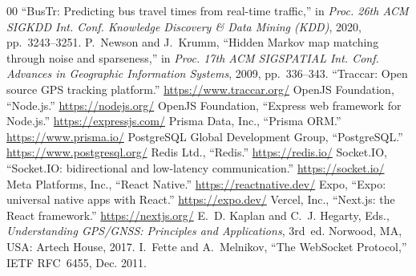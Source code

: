 \documentclass[conference]{IEEEtran}
\begin{document}
\begin{thebibliography}{00}
``BusTr: Predicting bus travel times from real-time traffic,'' in
\textit{Proc. 26th ACM SIGKDD Int. Conf. Knowledge Discovery \& Data Mining
(KDD)}, 2020, pp.~3243--3251.
P.~Newson and J.~Krumm, ``Hidden Markov map matching through noise and
sparseness,'' in \textit{Proc. 17th ACM SIGSPATIAL Int. Conf. Advances in
Geographic Information Systems}, 2009, pp.~336--343.
``Traccar: Open source GPS tracking platform.'' \url{https://www.traccar.org/}
OpenJS Foundation, ``Node.js.'' \url{https://nodejs.org/}
OpenJS Foundation, ``Express web framework for Node.js.''
\url{https://expressjs.com/}
Prisma Data, Inc., ``Prisma ORM.'' \url{https://www.prisma.io/}
PostgreSQL Global Development Group, ``PostgreSQL.''
\url{https://www.postgresql.org/}
Redis Ltd., ``Redis.'' \url{https://redis.io/}
Socket.IO, ``Socket.IO: bidirectional and low-latency communication.''
\url{https://socket.io/}
Meta Platforms, Inc., ``React Native.'' \url{https://reactnative.dev/}
Expo, ``Expo: universal native apps with React.'' \url{https://expo.dev/}
Vercel, Inc., ``Next.js: the React framework.'' \url{https://nextjs.org/}
E.~D. Kaplan and C.~J. Hegarty, Eds., \textit{Understanding GPS/GNSS:
Principles and Applications}, 3rd~ed. Norwood, MA, USA: Artech House, 2017.
I.~Fette and A.~Melnikov, ``The WebSocket Protocol,'' IETF RFC~6455,
Dec. 2011.
\end{thebibliography}
\end{document}
